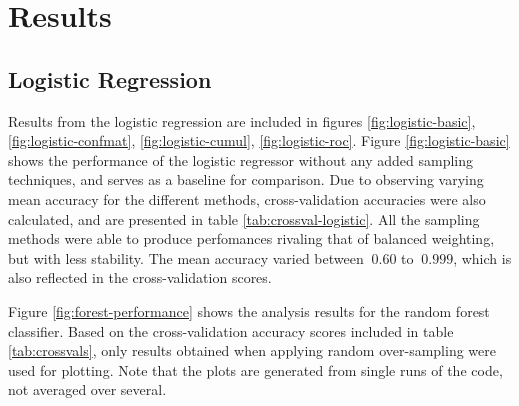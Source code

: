 \section{Results}
\subsection{Logistic Regression}
Results from the logistic regression are included in figures 
\ref{fig:logistic-basic}, \ref{fig:logistic-confmat}, \ref{fig:logistic-cumul}, 
\ref{fig:logistic-roc}. Figure \ref{fig:logistic-basic} shows the performance of
the logistic regressor without any added sampling techniques, and serves as
a baseline for comparison.
Due to observing varying mean accuracy for the different methods,
cross-validation accuracies were also calculated, and are presented in table
\ref{tab:crossval-logistic}.
All the sampling methods were able to produce perfomances rivaling that of
balanced weighting, but with less stability. The mean accuracy varied between
$~0.60$ to $~0.999$, which is also reflected in the cross-validation scores. 

Figure \ref{fig:forest-performance} shows the analysis results for the random
forest classifier. Based on the cross-validation accuracy scores included
in table \ref{tab:crossvals}, only results obtained when applying random
over-sampling were used for plotting.
Note that the plots are generated from single runs of the code, not averaged
over several.

